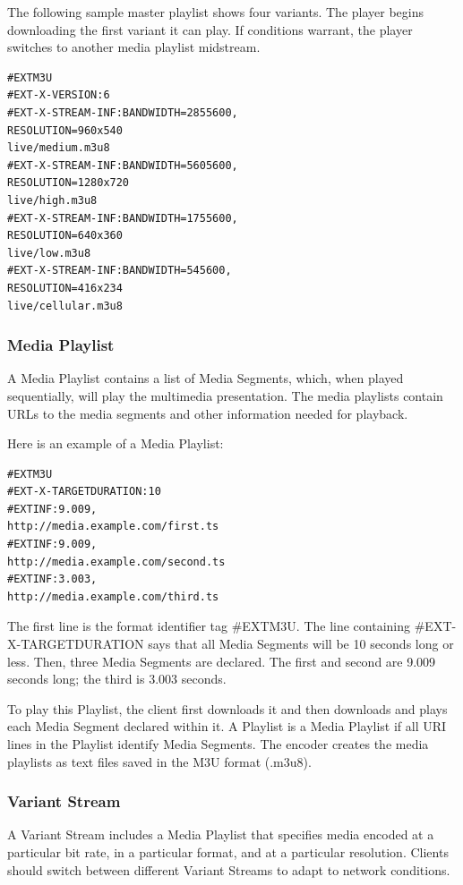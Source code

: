 The following sample master playlist shows four variants. The player begins downloading the first variant it can play. If conditions warrant, the player switches to another media playlist midstream.

\begin{verbatim}
#EXTM3U
#EXT-X-VERSION:6
#EXT-X-STREAM-INF:BANDWIDTH=2855600,
RESOLUTION=960x540
live/medium.m3u8
#EXT-X-STREAM-INF:BANDWIDTH=5605600,
RESOLUTION=1280x720
live/high.m3u8
#EXT-X-STREAM-INF:BANDWIDTH=1755600,
RESOLUTION=640x360
live/low.m3u8
#EXT-X-STREAM-INF:BANDWIDTH=545600,
RESOLUTION=416x234
live/cellular.m3u8
\end{verbatim}

\subsubsection{Media Playlist}

A Media Playlist contains a list of Media Segments, which, when played sequentially, will play the multimedia presentation. The media playlists contain URLs to the media segments and other information needed for playback. 
   
Here is an example of a Media Playlist:
\begin{verbatim}
#EXTM3U
#EXT-X-TARGETDURATION:10
#EXTINF:9.009,
http://media.example.com/first.ts
#EXTINF:9.009,
http://media.example.com/second.ts
#EXTINF:3.003,
http://media.example.com/third.ts
\end{verbatim}
   
The first line is the format identifier tag \#EXTM3U. The line containing \#EXT-X-TARGETDURATION says that all Media Segments will be 10 seconds long or less.  Then, three Media Segments are declared. The first and second are 9.009 seconds long; the third is 3.003 seconds.

To play this Playlist, the client first downloads it and then downloads and plays each Media Segment declared within it. A Playlist is a Media Playlist if all URI lines in the Playlist identify Media Segments. The encoder creates the media playlists as text files saved in the M3U format (.m3u8). \cite{applehls}

\subsubsection{Variant Stream}

A Variant Stream includes a Media Playlist that specifies media encoded at a particular bit rate, in a particular format, and at a particular resolution. Clients should switch between different Variant Streams to adapt to network conditions.


